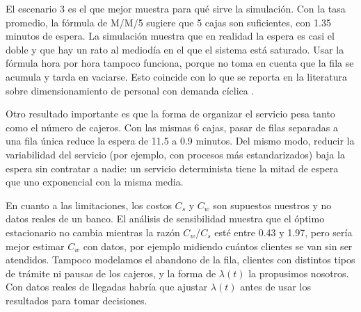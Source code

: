 \documentclass[11pt,letterpaper]{article}
\begin{document}
El escenario 3 es el que mejor muestra para qué sirve la simulación. Con la tasa
promedio, la fórmula de M/M/5 sugiere que 5 cajas son suficientes, con 1.35 minutos de
espera. La simulación muestra que en realidad la espera es casi el doble y que hay un
rato al mediodía en el que el sistema está saturado. Usar la fórmula hora por hora
tampoco funciona, porque no toma en cuenta que la fila se acumula y tarda en vaciarse.
Esto coincide con lo que se reporta en la literatura sobre dimensionamiento de personal
con demanda cíclica \cite{green}.

Otro resultado importante es que la forma de organizar el servicio pesa tanto como el
número de cajeros. Con las mismas 6 cajas, pasar de filas separadas a una fila única
reduce la espera de 11.5 a 0.9 minutos. Del mismo modo, reducir la variabilidad del
servicio (por ejemplo, con procesos más estandarizados) baja la espera sin contratar a
nadie: un servicio determinista tiene la mitad de espera que uno exponencial con la misma
media.

En cuanto a las limitaciones, los costos $C_s$ y $C_w$ son supuestos nuestros y no datos
reales de un banco. El análisis de sensibilidad muestra que el óptimo estacionario no
cambia mientras la razón $C_w/C_s$ esté entre 0.43 y 1.97, pero sería mejor estimar $C_w$
con datos, por ejemplo midiendo cuántos clientes se van sin ser atendidos. Tampoco
modelamos el abandono de la fila, clientes con distintos tipos de trámite ni pausas de los
cajeros, y la forma de $\lambda(t)$ la propusimos nosotros. Con datos reales de llegadas
habría que ajustar $\lambda(t)$ antes de usar los resultados para tomar decisiones.

\end{document}
